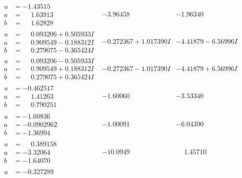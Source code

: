 \documentclass[1p]{elsarticle_modified}
\theoremstyle{definition}
\begin{document}
$$\begin{array}{c|c|c}
\begin{aligned}
u &= -1.43515\phantom{ +0.000000I} \\
a &= \phantom{-}1.63913\phantom{ +0.000000I} \\
b &= \phantom{-}1.62828\phantom{ +0.000000I}\end{aligned}
 & -3.96458\phantom{ +0.000000I} & -1.96340\phantom{ +0.000000I} \\ \hline\begin{aligned}
u &= \phantom{-}0.093206 + 0.505933 I \\
a &= \phantom{-}0.909549 - 0.188312 I \\
b &= \phantom{-}0.279075 - 0.365424 I\end{aligned}
 & -0.272367 + 1.017390 I & -4.41879 - 6.56996 I \\ \hline\begin{aligned}
u &= \phantom{-}0.093206 - 0.505933 I \\
a &= \phantom{-}0.909549 + 0.188312 I \\
b &= \phantom{-}0.279075 + 0.365424 I\end{aligned}
 & -0.272367 - 1.017390 I & -4.41879 + 6.56996 I \\ \hline\begin{aligned}
u &= -0.462517\phantom{ +0.000000I} \\
a &= \phantom{-}1.41263\phantom{ +0.000000I} \\
b &= \phantom{-}0.790251\phantom{ +0.000000I}\end{aligned}
 & -1.60060\phantom{ +0.000000I} & -3.53340\phantom{ +0.000000I} \\ \hline\begin{aligned}
u &= -1.60836\phantom{ +0.000000I} \\
a &= -0.0902962\phantom{ +0.000000I} \\
b &= -1.36994\phantom{ +0.000000I}\end{aligned}
 & -1.00091\phantom{ +0.000000I} & -6.04390\phantom{ +0.000000I} \\ \hline\begin{aligned}
u &= \phantom{-}0.389158\phantom{ +0.000000I} \\
a &= -3.32064\phantom{ +0.000000I} \\
b &= -1.64070\phantom{ +0.000000I}\end{aligned}
 & -10.0949\phantom{ +0.000000I} & \phantom{-}1.45710\phantom{ +0.000000I} \\ \hline\begin{aligned}
u &= -0.327289\phantom{ +0.000000I} \\

\end{aligned}
\end{array}$$
\end{document}
